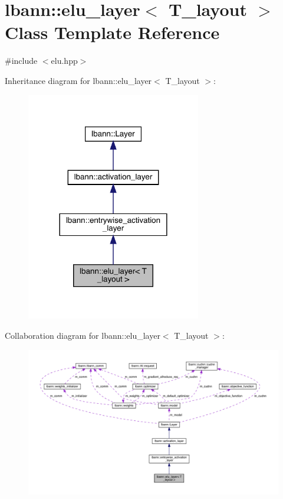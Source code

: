 \hypertarget{classlbann_1_1elu__layer}{}\section{lbann\+:\+:elu\+\_\+layer$<$ T\+\_\+layout $>$ Class Template Reference}
\label{classlbann_1_1elu__layer}


{\ttfamily \#include $<$elu.\+hpp$>$}



Inheritance diagram for lbann\+:\+:elu\+\_\+layer$<$ T\+\_\+layout $>$\+:\nopagebreak
\begin{figure}[H]
\begin{center}
\leavevmode
\includegraphics[width=216pt]{classlbann_1_1elu__layer__inherit__graph}
\end{center}
\end{figure}


Collaboration diagram for lbann\+:\+:elu\+\_\+layer$<$ T\+\_\+layout $>$\+:\nopagebreak
\begin{figure}[H]
\begin{center}
\leavevmode
\includegraphics[width=350pt]{classlbann_1_1elu__layer__coll__graph}
\end{center}
\end{figure}
